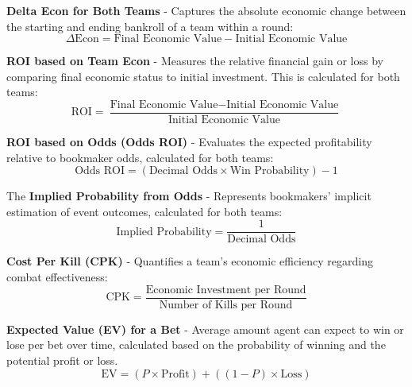 \documentclass[sigconf]{acmart}
\begin{document}
\bigskip

\textbf{Delta Econ for Both Teams} - Captures the absolute economic change between the starting and ending bankroll of a team within a round:
\begin{equation}
\Delta\text{Econ} = \text{Final Economic Value} - \text{Initial Economic Value}
\end{equation}

\bigskip

\textbf{ROI based on Team Econ} - Measures the relative financial gain or loss by comparing final economic status to initial investment. This is calculated for both teams:
\begin{equation}
  \text{ROI} = \frac{\text{Final Economic Value} - \text{Initial Economic Value}}{\text{Initial Economic Value}}
\end{equation}

\bigskip

\textbf{ROI based on Odds (Odds ROI)} - Evaluates the expected profitability relative to bookmaker odds, calculated for both teams:
\begin{equation}
\text{Odds ROI} = (\text{Decimal Odds} \times \text{Win Probability}) - 1
\end{equation}

\bigskip

The \textbf{Implied Probability from Odds} - Represents bookmakers' implicit estimation of event outcomes, calculated for both teams:
\begin{equation}
\text{Implied Probability} = \frac{1}{\text{Decimal Odds}}
\end{equation}

\bigskip

\textbf{Cost Per Kill (CPK)} - Quantifies a team's economic efficiency regarding combat effectiveness:
\begin{equation}
\text{CPK} = \frac{\text{Economic Investment per Round}}{\text{Number of Kills per Round}}
\end{equation}

\bigskip

\textbf{Expected Value (EV) for a Bet} - Average amount agent can expect to win or lose per bet over time, calculated based on the probability of winning and the potential profit or loss.
\begin{equation}
\text{EV} = (P \times \text{Profit}) + ((1 - P) \times \text{Loss})
\end{equation}

\bigskip
\end{document}
